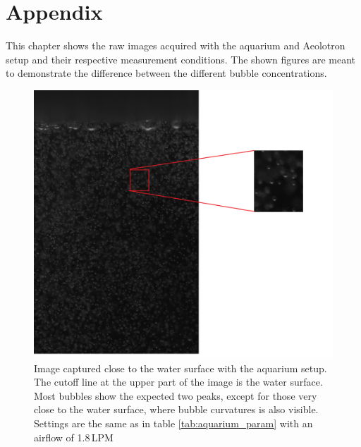 \chapter{Appendix}\label{chap:appendix}
This chapter shows the raw images acquired with the aquarium and Aeolotron setup and their respective measurement conditions. The shown figures are meant to demonstrate the difference between the different bubble concentrations.

\begin{figure}
	\centering
	\includegraphics[scale=0.4]{images/aquarium_result_surf.png}
	\caption{Image captured close to the water surface with the aquarium setup. The cutoff line at the upper part of the image is the water surface.  
	Most bubbles show the expected two peaks, except for those very close to the water surface, where bubble curvatures is also visible. Settings are the same as in table \ref{tab:aquarium_param} with an airflow of 1.8\,LPM}
\end{figure}

